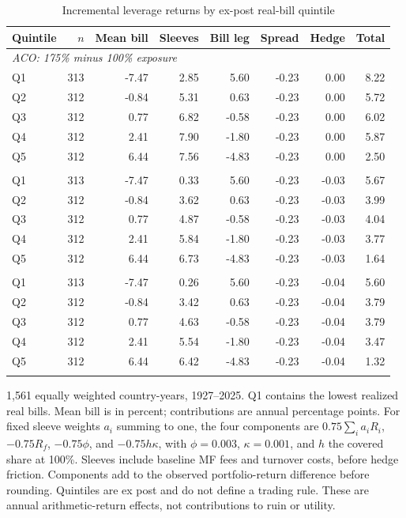 \begin{table}[htbp]\centering\scriptsize
\caption{Incremental leverage returns by ex-post real-bill quintile}\label{tab:bill-quintiles}
\begin{tabular}{lrrrrrrr}\toprule
Quintile & $n$ & Mean bill & Sleeves & Bill leg & Spread & Hedge & Total \\
\midrule
\multicolumn{8}{l}{\textit{ACO: 175\% minus 100\% exposure}} \\
Q1 & 313 & -7.47 & 2.85 & 5.60 & -0.23 & 0.00 & 8.22 \\
Q2 & 312 & -0.84 & 5.31 & 0.63 & -0.23 & 0.00 & 5.72 \\
Q3 & 312 & 0.77 & 6.82 & -0.58 & -0.23 & 0.00 & 6.02 \\
Q4 & 312 & 2.41 & 7.90 & -1.80 & -0.23 & 0.00 & 5.87 \\
Q5 & 312 & 6.44 & 7.56 & -4.83 & -0.23 & 0.00 & 2.50 \\
\addlinespace
\multicolumn{8}{l}{\textit{Proportional: 175\% minus 100\% exposure}} \\
Q1 & 313 & -7.47 & 0.33 & 5.60 & -0.23 & -0.03 & 5.67 \\
Q2 & 312 & -0.84 & 3.62 & 0.63 & -0.23 & -0.03 & 3.99 \\
Q3 & 312 & 0.77 & 4.87 & -0.58 & -0.23 & -0.03 & 4.04 \\
Q4 & 312 & 2.41 & 5.84 & -1.80 & -0.23 & -0.03 & 3.77 \\
Q5 & 312 & 6.44 & 6.73 & -4.83 & -0.23 & -0.03 & 1.64 \\
\addlinespace
\multicolumn{8}{l}{\textit{Equal-weight: 175\% minus 100\% exposure}} \\
Q1 & 313 & -7.47 & 0.26 & 5.60 & -0.23 & -0.04 & 5.60 \\
Q2 & 312 & -0.84 & 3.42 & 0.63 & -0.23 & -0.04 & 3.79 \\
Q3 & 312 & 0.77 & 4.63 & -0.58 & -0.23 & -0.04 & 3.79 \\
Q4 & 312 & 2.41 & 5.54 & -1.80 & -0.23 & -0.04 & 3.47 \\
Q5 & 312 & 6.44 & 6.42 & -4.83 & -0.23 & -0.04 & 1.32 \\
\addlinespace
\bottomrule\end{tabular}
\par\smallskip\begin{minipage}{0.97\textwidth}\footnotesize
1,561 equally weighted country-years, 1927--2025. Q1 contains the lowest realized real bills. Mean bill is in percent; contributions are annual percentage points. For fixed sleeve weights $a_i$ summing to one, the four components are $0.75\sum_i a_iR_i$, $-0.75R_f$, $-0.75\phi$, and $-0.75h\kappa$, with $\phi=0.003$, $\kappa=0.001$, and $h$ the covered share at 100\%. Sleeves include baseline MF fees and turnover costs, before hedge friction. Components add to the observed portfolio-return difference before rounding. Quintiles are ex post and do not define a trading rule. These are annual arithmetic-return effects, not contributions to ruin or utility.
\end{minipage}\end{table}
